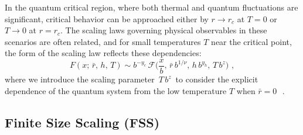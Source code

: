 In the quantum critical region, where both thermal and quantum fluctuations are significant, critical behavior can be approached either by $ r \rightarrow r_c $ at $ T = 0 $ or $ T \rightarrow 0 $ at $ r = r_c $. The scaling laws governing physical observables in these scenarios are often related, and for small temperatures $ T $ near the critical point, the form of the scaling law reflects these dependencies:
\begin{equation}
	\label{scalinglawT}
	F(x;\,\bar r,\,h,\,T) \sim b^{-y_c} \, \mathscr{F}\biggl( \frac{x}{b} , \,\bar r \,b^{1/\nu}, \, h\,b^{y_h} , \,T\,b^z \biggl) \,\, ,
\end{equation}
where we introduce the scaling parameter $\,T\,b^z \,$ to consider the explicit dependence of the quantum system from the low temperature $T$ when $\bar r=0\,$~\cite{S99}.


\subsection{Finite Size Scaling (FSS)}

